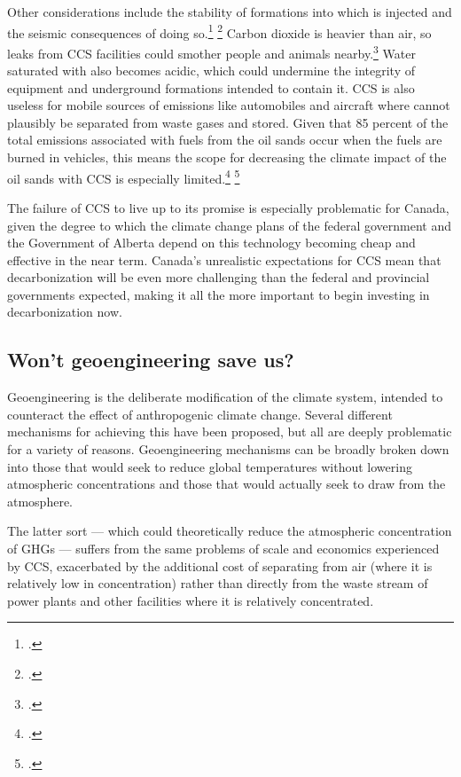 \documentclass[10pt]{article}
\begin{document}
Other considerations include the stability of formations into which  is injected and the seismic consequences of doing so.\footcite[][]{CCSEarthquake} \footcite[See also: ][]{AFPonCCS}
Carbon dioxide is heavier than air, so leaks from CCS facilities could smother people and animals nearby.\footcite[][]{TroubleInStore}
Water saturated with  also becomes acidic, which could undermine the integrity of equipment and underground formations intended to contain it.
CCS is also useless for mobile sources of emissions like automobiles and aircraft where  cannot plausibly be separated from waste gases and stored.
Given that 85 percent of the total emissions associated with fuels from the oil sands occur when the fuels are burned in vehicles, this means the scope for decreasing the climate impact of the oil sands with CCS is especially limited.\footcite[][]{HardToScrub} \footcite[][]{NoSilverBullet}



The failure of CCS to live up to its promise is especially problematic for Canada, given the degree to which the climate change plans of the federal government and the Government of Alberta depend on this technology becoming cheap and effective in the near term.
Canada's unrealistic expectations for CCS mean that decarbonization will be even more challenging than the federal and provincial governments expected, making it all the more important to begin investing in decarbonization now.



	\subsection{Won't geoengineering save us?}
	\label{GeoSaves}
	
	
Geoengineering is the deliberate modification of the climate system, intended to counteract the effect of anthropogenic climate change.
Several different mechanisms for achieving this have been proposed, but all are deeply problematic for a variety of reasons.
Geoengineering mechanisms can be broadly broken down into those that would seek to reduce global temperatures without lowering atmospheric  concentrations and those that would actually seek to draw  from the atmosphere.



The latter sort --- which could theoretically reduce the atmospheric concentration of GHGs --- suffers from the same problems of scale and economics experienced by CCS, exacerbated by the additional cost of separating  from air (where it is relatively low in concentration) rather than directly from the waste stream of power plants and other facilities where it is relatively concentrated.  
\end{document}
